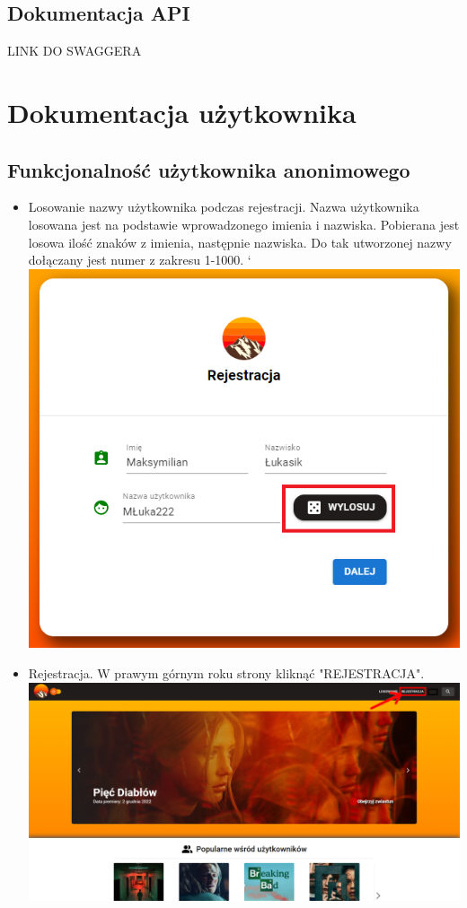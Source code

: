 \documentclass[12pt]{article}
\begin{document}
\begin{flushleft}
		\subsection{Dokumentacja API}	%
		LINK DO SWAGGERA
\pagebreak
			
	\section{Dokumentacja użytkownika}
		\subsection{Funkcjonalność użytkownika anonimowego}
		\begin{itemize}
			\item Losowanie nazwy użytkownika podczas rejestracji.		
			Nazwa użytkownika losowana jest na podstawie wprowadzonego imienia i nazwiska. Pobierana jest losowa ilość znaków z imienia, następnie nazwiska. Do tak utworzonej nazwy dołączany jest numer z zakresu 1-1000. \linebreak`
			\includegraphics[scale=0.7]{WylosowanieNazwy.png} \linebreak
			\item Rejestracja.
			W prawym górnym roku strony kliknąć "REJESTRACJA". \linebreak
			\includegraphics[scale=0.3]{Rejestracja1.png} \linebreak

\end{itemize}
\end{flushleft}
\end{document}

